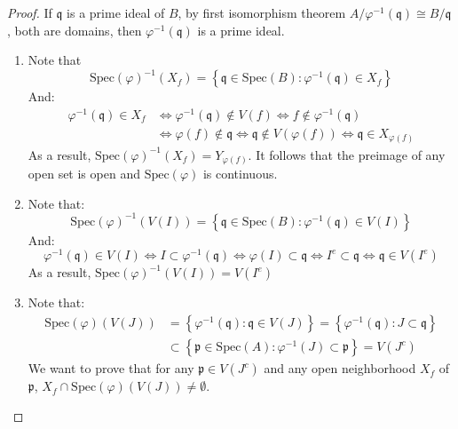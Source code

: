 \documentclass{solution}
\begin{document}
\begin{proof}
    If $\mathfrak{q}$ is a prime ideal of $B$, by first isomorphism theorem $A / \varphi ^{-1}(\mathfrak{q}) \cong B / \mathfrak{q}$, both are domains, then $\varphi ^{-1}(\mathfrak{q})$ is a prime ideal.

    \begin{enumerate}
        \item Note that
        $$\mathrm{Spec}(\varphi) ^{-1} (X_f) = \left\lbrace \mathfrak{q} \in \mathrm{Spec}(B): \varphi ^{-1}(\mathfrak{q}) \in X_f \right\rbrace$$
        And:
        $$
            \begin{aligned}
            \varphi ^{-1}(\mathfrak{q}) \in X_f &\Leftrightarrow \varphi ^{-1}(\mathfrak{q}) \notin V(f) \Leftrightarrow f \notin \varphi ^{-1}(\mathfrak{q}) \\
            & \Leftrightarrow \varphi (f) \notin \mathfrak{q} \Leftrightarrow \mathfrak{q} \notin V(\varphi(f)) \Leftrightarrow \mathfrak{q} \in X_{\varphi(f)}
            \end{aligned}
        $$
        As a result, $\mathrm{Spec}(\varphi) ^{-1} (X_f) = Y_{\varphi(f)}$. It follows that the preimage of any open set is open and $\mathrm{Spec}(\varphi)$ is continuous.
        \item Note that:
        $$\mathrm{Spec}(\varphi) ^{-1}(V(I)) = \left\lbrace \mathfrak{q} \in \mathrm{Spec}(B): \varphi ^{-1}(\mathfrak{q}) \in V(I)  \right\rbrace$$
        And:
        $$
            \varphi ^{-1}(\mathfrak{q}) \in V(I) \Leftrightarrow I \subset \varphi ^{-1}(\mathfrak{q}) \Leftrightarrow \varphi(I) \subset \mathfrak{q} \Leftrightarrow I^e \subset \mathfrak{q} \Leftrightarrow \mathfrak{q} \in V(I^e)
        $$
        As a result, $\mathrm{Spec}(\varphi) ^{-1}(V(I)) = V(I^e)$

        \item Note that:
        $$
            \begin{aligned}
            \mathrm{Spec}(\varphi) (V(J)) &= \left\lbrace \varphi ^{-1}(\mathfrak{q}): \mathfrak{q} \in V(J) \right\rbrace = \left\lbrace \varphi ^{-1}(\mathfrak{q}): J \subset \mathfrak{q} \right\rbrace \\
            &\subset \left\lbrace \mathfrak{p} \in \mathrm{Spec}(A): \varphi ^{-1}(J) \subset \mathfrak{p} \right\rbrace = V(J^c)
            \end{aligned}
        $$
        We want to prove that for any $\mathfrak{p} \in V(J^c)$ and any open neighborhood $X_f$ of $\mathfrak{p}$, $X_f \cap \mathrm{Spec}(\varphi) (V(J)) \ne \emptyset$.


\end{enumerate}
\end{proof}
\end{document}
